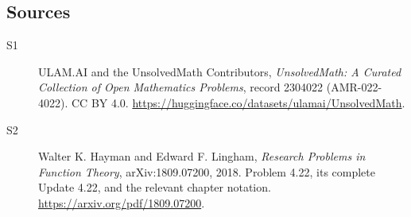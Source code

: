 \documentclass[11pt]{book}
\begin{document}
\subsection{Sources}
\begin{description}
\item[\hypertarget{source:2304022:1}{S1}] ULAM.AI and the UnsolvedMath Contributors, \emph{UnsolvedMath: A Curated Collection of Open Mathematics Problems}, record 2304022 (AMR-022-4022). CC BY 4.0. \url{https://huggingface.co/datasets/ulamai/UnsolvedMath}.
\item[\hypertarget{source:2304022:2}{S2}] Walter K. Hayman and Edward F. Lingham, \emph{Research Problems in Function Theory}, arXiv:1809.07200, 2018. Problem 4.22, its complete Update 4.22, and the relevant chapter notation. \url{https://arxiv.org/pdf/1809.07200}.
\end{description}
\label{end:2304022}
\end{document}
